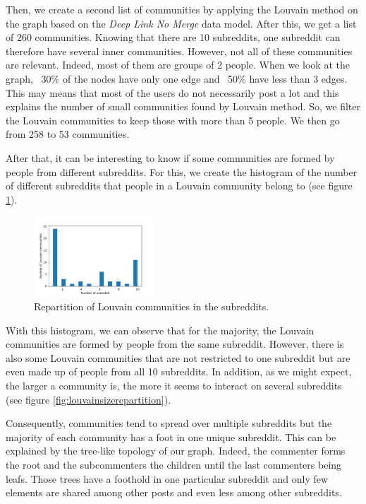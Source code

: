 Then, we create a second list of communities by applying the Louvain method on the graph based on the \textit{Deep Link No Merge} data model.
After this, we get a list of 260 communities. Knowing that there are 10 subreddits, one subreddit can therefore have several inner communities. However, not all of these communities are relevant. Indeed, most of them are groups of 2 people. When we look at the graph, ~30\% of the nodes have only one edge and ~50\% have less than 3 edges. This may means that most of the users do not necessarily post a lot and this explains the number of small communities found by Louvain method. So, we filter the Louvain communities to keep those with more than 5 people. We then go from 258 to 53 communities.

After that, it can be interesting to know if some communities are formed by people from different subreddits. For this, we create the histogram of the number of different subreddits that people in a Louvain community belong to (see figure \ref{fig:louvainrepartition}).

\begin{figure}[ht!]
    \centering
    \includegraphics[width=0.4\textwidth]{figures/inner_communities_repartition.pdf}
    \caption{Repartition of Louvain communities in the subreddits.}
    \label{fig:louvainrepartition}
\end{figure}

With this histogram, we can observe that for the majority, the Louvain communities are formed by people from the same subreddit. However, there is also some Louvain communities that are not restricted to one subreddit but are even made up of people from all 10 subreddits. In addition, as we might expect, the larger a community is, the more it seems to interact on several subreddits (see figure \ref{fig:louvainsizerepartition}).

Consequently, communities tend to spread over multiple subreddits but the majority of each community has a foot in one unique subreddit. This can be explained by the tree-like topology of our graph. Indeed, the commenter forms the root and the subcommenters the children until the last commenters being leafs. Those trees have a foothold in one particular subreddit and only few elements are shared among other posts and even less among other subreddits.

